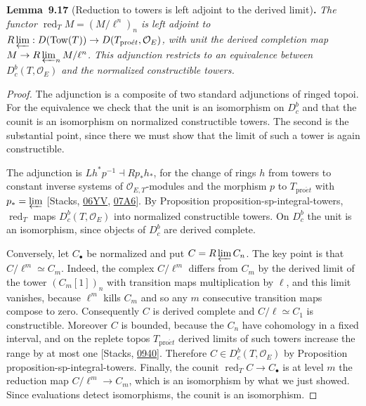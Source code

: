 \documentclass[11pt]{article}
\newenvironment{bpstatement}[2]{\par\addvspace{0.6\baselineskip}\noindent\textbf{#1}#2\textbf{.}\enspace\ignorespaces}
  {\par\addvspace{0.4\baselineskip}}
\newenvironment{bpstatementit}[2]{\begin{bpstatement}{#1}{#2}\itshape\ignorespaces}{\end{bpstatement}}
\providecommand{\Dbc}{}\renewcommand{\Dbc}{D^b_c}
\begin{document}
\label{bp55}%
\begin{bpstatementit}{Lemma~9.17}{ (Reduction to towers is left adjoint to the derived limit)}
The functor \(\operatorname{red}_TM=(M/\ell^n)_n\) is left adjoint to \(R\varprojlim:D(\operatorname{Tow}(T))\to D(T_{\mathrm{pro}\acute{e}t},\mathcal O_E)\), with unit the derived completion map \(M\to R\varprojlim_nM/\ell^n\). This adjunction restricts to an equivalence between \(\Dbc(T,\mathcal O_E)\) and the normalized constructible towers.
\end{bpstatementit}

\begin{proof}[{Proof}]\label{bp56}%
The adjunction is a composite of two standard adjunctions of ringed topoi. For the equivalence we check that the unit is an isomorphism on \(\Dbc\) and that the counit is an isomorphism on normalized constructible towers. The second is the substantial point, since there we must show that the limit of such a tower is again constructible.

The adjunction is \(Lh^*p^{-1}\dashv Rp_*h_*\), for the change of rings \(h\) from towers to constant inverse systems of \(\mathcal O_{E,T}\)-modules and the morphism \(p\) to \(T_{\mathrm{pro}\acute{e}t}\) with \(p_*=\varprojlim\) [Stacks, \href{https://stacks.math.columbia.edu/tag/06YV}{06YV}, \href{https://stacks.math.columbia.edu/tag/07A6}{07A6}]. By Proposition proposition-sp-integral-towers, \(\operatorname{red}_T\) maps \(\Dbc(T,\mathcal O_E)\) into normalized constructible towers. On \(\Dbc\) the unit is an isomorphism, since objects of \(\Dbc\) are derived complete.

Conversely, let \(C_\bullet\) be normalized and put \(C=R\varprojlim C_n\). The key point is that \(C/\ell^m\simeq C_m\). Indeed, the complex \(C/\ell^m\) differs from \(C_m\) by the derived limit of the tower \((C_m[1])_n\) with transition maps multiplication by \(\ell\), and this limit vanishes, because \(\ell^m\) kills \(C_m\) and so any \(m\) consecutive transition maps compose to zero. Consequently \(C\) is derived complete and \(C/\ell\simeq C_1\) is constructible. Moreover \(C\) is bounded, because the \(C_n\) have cohomology in a fixed interval, and on the replete topos \(T_{\mathrm{pro}\acute{e}t}\) derived limits of such towers increase the range by at most one [Stacks, \href{https://stacks.math.columbia.edu/tag/0940}{0940}]. Therefore \(C\in\Dbc(T,\mathcal O_E)\) by Proposition proposition-sp-integral-towers. Finally, the counit \(\operatorname{red}_TC\to C_\bullet\) is at level \(m\) the reduction map \(C/\ell^m\to C_m\), which is an isomorphism by what we just showed. Since evaluations detect isomorphisms, the counit is an isomorphism.
\end{proof}
\end{document}
